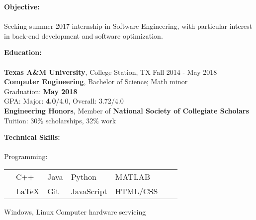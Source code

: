 \documentclass[12pt]{article}
\begin{document}
\begin{flushleft}
\begin{outline}[compactitem]

\newlength{\upspacelength}
\setlength{\upspacelength}{-1.3px}
\newcommand{\upspace}{\vspace{\upspacelength}}
\newcommand{\zzz}[1]{\upspace \0 \textbf{#1} \\ \vspace{-0.8\baselineskip} \hrulefill \vspace{-2px} \\ }
\let\oldOne\1\let\oldTwo\2\let\oldThree\3\let\oldFour\4
\renewcommand{\1}{\upspace \oldOne  }
\renewcommand{\2}{\upspace \oldTwo  }
\renewcommand{\3}{\upspace \oldThree}
\renewcommand{\4}{\upspace \oldFour }


\zzz{Objective:}
  \1 Seeking summer 2017 internship in Software Engineering, with particular interest in back-end development and software optimization.

\zzz{Education:}
  \1 \textbf{Texas A\&M University}, College Station, TX \hfill Fall 2014 - May 2018
  \\ \textbf{Computer Engineering}, Bachelor of Science; Math minor
  \\ Graduation: \textbf{May 2018}
  \\ GPA:  Major: \textbf{4.0}/4.0, Overall: 3.72/4.0
  \\ \textbf{Engineering Honors}, Member of \textbf{National Society of Collegiate Scholars}
  \\ Tuition: $30\%$ scholarships, $32\%$ work

\zzz{Technical Skills:}
  \1 Programming: 
    \\
    \vspace{-\baselineskip}\vspace{-\upspacelength}
    \begin{tabularx}{\textwidth}{X X X X X X X}
      & C++   & Java & Python     & MATLAB   \upspace \\
      & LaTeX & Git  & JavaScript & HTML/CSS \upspace \\
    \end{tabularx}
    \vspace{-5px}\upspace
  \1 
    Windows, Linux
    \hfill{}\hspace{1px}
    Computer hardware servicing
    \hfill\hfill


\end{outline}
\end{flushleft}
\end{document}
